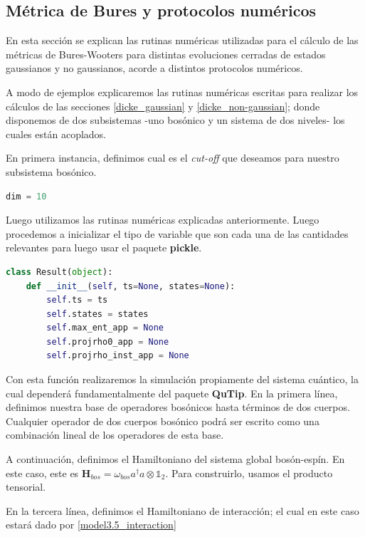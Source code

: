 \documentclass{report} %
\numberwithin{equation}{section}
\begin{document}
\subsection{M\'etrica de Bures y protocolos num\'ericos}

En esta sección se explican las rutinas numéricas utilizadas para el cálculo de las métricas de Bures-Wooters para distintas evoluciones cerradas de estados gaussianos y no gaussianos, acorde a distintos protocolos numéricos. 

A modo de ejemplos explicaremos las rutinas numéricas escritas para realizar los cálculos de las secciones \ref{dicke_gaussian} y \ref{dicke_non-gaussian}; donde disponemos de dos subsistemas -uno bosónico y un sistema de dos niveles- los cuales están acoplados. 

En primera instancia, definimos cual es el \textit{cut-off} que deseamos para nuestro subsistema bosónico. 

\begin{lstlisting}[language=Python]
    dim = 10
\end{lstlisting}

Luego utilizamos las rutinas numéricas explicadas anteriormente. Luego procedemos a inicializar el tipo de variable que son cada una de las cantidades relevantes para luego usar el paquete \textbf{pickle}. 

\begin{lstlisting}[language=Python]
class Result(object):
    def __init__(self, ts=None, states=None):
        self.ts = ts
        self.states = states
        self.max_ent_app = None
        self.projrho0_app = None
        self.projrho_inst_app = None 
\end{lstlisting}

Con esta función realizaremos la simulación propiamente del sistema cuántico, la cual dependerá fundamentalmente del paquete \textbf{QuTip}. En la primera línea, definimos nuestra base de operadores bosónicos hasta términos de dos cuerpos. Cualquier operador de dos cuerpos bosónico podrá ser escrito como una combinación lineal de los operadores de esta base.

A continuación, definimos el Hamiltoniano del sistema global bosón-espín. En este caso, este es $\mathbf{H}_{bos} = \omega_{bos} a^{\dagger}a \otimes \mathds{1}_2$. Para construirlo, usamos el producto tensorial. 

En la tercera línea, definimos el Hamiltoniano de interacción; el cual en este caso estará dado por \eqref{model3.5_interaction}
\end{document}
